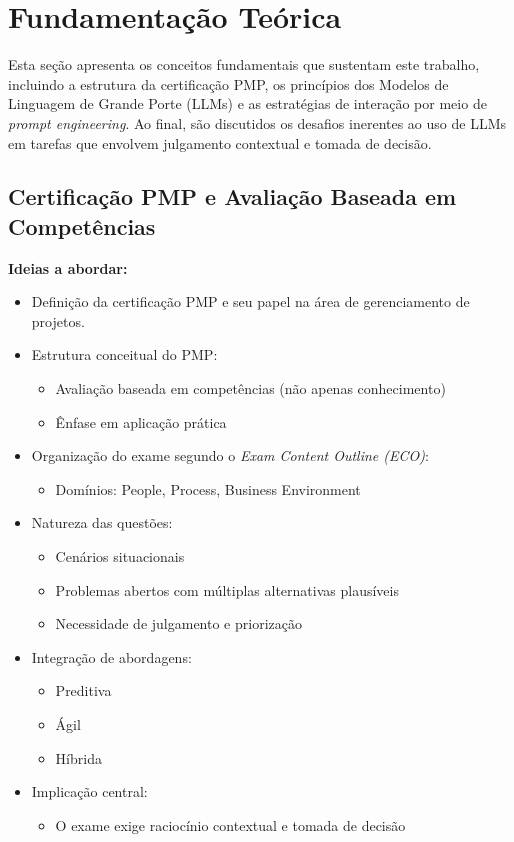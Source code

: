\chapter{Fundamentação Teórica}
\label{sec:fundamentacao}

Esta seção apresenta os conceitos fundamentais que sustentam este trabalho, incluindo a estrutura da certificação PMP, os princípios dos Modelos de Linguagem de Grande Porte (LLMs) e as estratégias de interação por meio de \textit{prompt engineering}. Ao final, são discutidos os desafios inerentes ao uso de LLMs em tarefas que envolvem julgamento contextual e tomada de decisão.




\section{Certificação PMP e Avaliação Baseada em Competências}
\label{subsec:pmp}

\textbf{Ideias a abordar:}
\begin{itemize}
    \item Definição da certificação PMP e seu papel na área de gerenciamento de projetos.
    \item Estrutura conceitual do PMP:
    \begin{itemize}
        \item Avaliação baseada em competências (não apenas conhecimento)
        \item Ênfase em aplicação prática
    \end{itemize}
    \item Organização do exame segundo o \textit{Exam Content Outline (ECO)}:
    \begin{itemize}
        \item Domínios: People, Process, Business Environment
    \end{itemize}
    \item Natureza das questões:
    \begin{itemize}
        \item Cenários situacionais
        \item Problemas abertos com múltiplas alternativas plausíveis
        \item Necessidade de julgamento e priorização
    \end{itemize}
    \item Integração de abordagens:
    \begin{itemize}
        \item Preditiva
        \item Ágil
        \item Híbrida
    \end{itemize}
    \item Implicação central:
    \begin{itemize}
        \item O exame exige raciocínio contextual e tomada de decisão
    \end{itemize}
\end{itemize}




